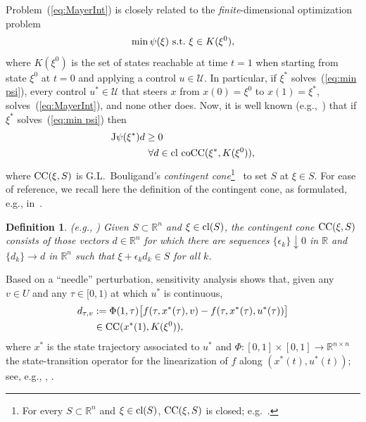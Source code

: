 \documentclass[letterpaper,10pt,conference]{ieeeconf}
\def\R{{\mathbb{R}}}
\newtheorem{definition}{Definition} %
\begin{document}
Problem~(\ref{eq:MayerInt}) is %
closely related to the {\em finite}-dimensional optimization problem
\begin{equation}
\label{eq:min psi}
\min \psi(\xi) {\rm ~s.t.~} \xi\in K(\xi^0),
\end{equation}
where $K(\xi^0)$ is the set of states reachable at time $t=1$
when starting from state $\xi^0$ at $t=0$ and applying
a control $u\in{\mathcal U}$.  
In particular, if $\xi^*$ solves~(\ref{eq:min psi}),
every control $u^*\in\mathcal U$ that steers $x$
from $x(0)=\xi^0$ to $x(1)=\xi^*$, %
solves~(\ref{eq:MayerInt}), and none other does.  
Now, it is well known (e.g.,~\cite[Chapter V, Lemma 1]{Varaiya72:0})
that if $\xi^*$ solves~(\ref{eq:min psi}) then
\begin{equation}
\label{eq:psi'>=0}
\begin{aligned}
{\rm J}\psi(\xi^*)d&\geq0\\
&~\forall d \in {\rm cl~coCC}(\xi^*,K(\xi^0)),
\end{aligned}
\end{equation}
where ${\rm CC}(\xi,S)$ 
is G.L.~Bouligand's {\em contingent cone}\footnote{\label{foot2}For every 
$S\subset\R^n$ and $\xi\in{\rm cl}(S)$,
${\rm CC}(\xi,S)$ is closed; 
e.g.~\cite[Proposition 6.2]{RW98}.}~\cite[section 3]{Bouligand1928}
to set $S$ at $\xi\in S$.
For ease of reference,
we recall here the definition of the contingent cone, as formulated, e.g.,
in~\cite[Theorem 6.3.6(a)]{BorweinLewis2000}.
\begin{definition}(e.g., \cite[Theorem 6.3.6(a)]{BorweinLewis2000})
\label{def:CC}
Given $S\subset\R^n$ and $\xi\in{\rm cl}(S)$,
the {\em contingent cone}
${\rm CC}(\xi,S)$ consists of those vectors
$d\in\R^n$ for which there are sequences $\{\epsilon_k\}\downarrow0$ in $\R$
and $\{d_k\}\to d$ in $\R^n$ such that $\xi+\epsilon_k d_k\in S$ for all $k$.
\end{definition}

\noindent
Based on a ``needle'' perturbation, sensitivity analysis shows
that, given 
any $v\in U$
and 
any $\tau\in[0,1)$ at which $u^*$ is continuous, 
\begin{equation}
\label{eq:htauv}
\begin{aligned}
d_{\tau,v}&:=\Phi (1,\tau)\bigl[f(\tau,x^*(\tau),v)-f(\tau,x^*(\tau),u^*(\tau))\bigr]\\
&\in {\rm CC}(x^*(1),K(\xi^0)),
\end{aligned}
\end{equation}
where $x^*$ is the state trajectory associated to $u^*$ 
and $\Phi:[0,1]\times[0,1]\to\R^{n\times n}$ the state-transition 
operator for the linearization of $f$ along $(x^*(t),u^*(t))$;
see, e.g., \cite[Exercise~1 in section VIII.1]{Varaiya72:0}, 
\cite[equation~(4.23)]{Liberzon2012}.   
\end{document}
